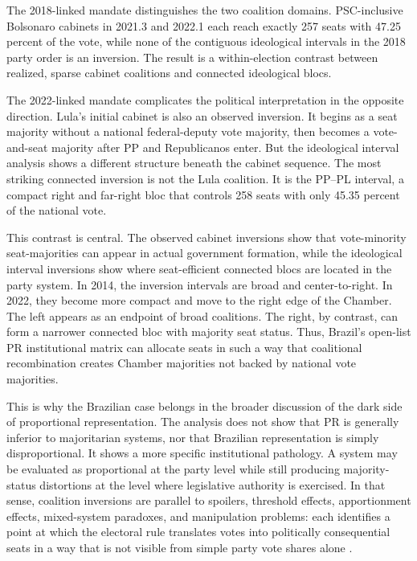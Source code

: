 \documentclass[11pt]{article}
\begin{document}
The 2018-linked mandate distinguishes the two coalition domains. PSC-inclusive
Bolsonaro cabinets in 2021.3 and 2022.1 each reach exactly 257 seats with 47.25
percent of the vote, while none of the contiguous ideological intervals in the
2018 party order is an inversion. The result is a within-election contrast
between realized, sparse cabinet coalitions and connected ideological blocs.

The 2022-linked mandate complicates the political interpretation in the opposite
direction. Lula's initial cabinet is also an observed inversion. It begins as a
seat majority without a national federal-deputy vote majority, then becomes a
vote-and-seat majority after PP and Republicanos enter. But the ideological
interval analysis shows a different structure beneath the cabinet sequence. The
most striking connected inversion is not the Lula coalition. It is the PP--PL
interval, a compact right and far-right bloc that controls 258 seats with only
45.35 percent of the national vote.

This contrast is central. The observed cabinet inversions show that
vote-minority seat-majorities can appear in actual government formation, while
the ideological interval inversions show where seat-efficient connected blocs
are located in the party system. In 2014, the inversion intervals are broad and
center-to-right. In 2022, they become more compact and move to the right edge of
the Chamber. The left appears as an endpoint of broad coalitions. The right, by
contrast, can form a narrower connected bloc with majority seat status. Thus,
Brazil's open-list PR institutional matrix can allocate seats in such a way that
coalitional recombination creates Chamber majorities not backed by national vote
majorities.


This is why the Brazilian case belongs in the broader discussion of the dark side of proportional representation. The analysis does not show that PR is generally inferior to majoritarian systems, nor that Brazilian representation is simply disproportional. It shows a more specific institutional pathology. A system may be evaluated as proportional at the party level while still producing majority-status distortions at the level where legislative authority is exercised. In that sense, coalition inversions are parallel to spoilers, threshold effects, apportionment effects, mixed-system paradoxes, and manipulation problems: each identifies a point at which the electoral rule translates votes into politically consequential seats in a way that is not visible from simple party vote shares alone \parencite{van1993paradoxes,kurrild2008voting,kaminski18_spoil_effec_propor_repres_system,FlisGrofmanKaminski2025Introduction}.
\end{document}

